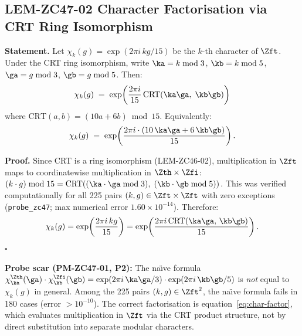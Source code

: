 \documentclass[12pt, a4paper]{article}
\begin{document}
\subsection{LEM-ZC47-02 \quad Character Factorisation via CRT
  Ring Isomorphism}
\label{sec:lem02}


\begin{formalbox}[title={LEM-ZC47-02: Character Factorisation
  (CRT Ring Isomorphism Form)}]
\textbf{Statement.}
Let $\chi_k(g) = \exp(2\pi i\, k g / 15)$ be the $k$-th
character of $\Zft$.
Under the CRT ring isomorphism, write
$\ka = k \bmod 3$, $\kb = k \bmod 5$,
$\ga = g \bmod 3$, $\gb = g \bmod 5$.
Then:
\begin{equation}
  \chi_k(g)
  \;=\;
  \exp\!\left(\frac{2\pi i}{15}\,
    \mathrm{CRT}(\ka\ga,\; \kb\gb)\right)
  \label{eq:char-factor}
\end{equation}
where $\mathrm{CRT}(a, b) = (10a + 6b) \bmod 15$.
Equivalently:
\begin{equation}
  \chi_k(g)
  \;=\;
  \exp\!\left(\frac{2\pi i \cdot (10\,\ka\ga + 6\,\kb\gb)}{15}\right).
  \label{eq:char-factor-expl}
\end{equation}

\textbf{Proof.}
Since CRT is a ring isomorphism
(LEM-ZC46-02), multiplication in $\Zft$ maps to coordinatewise
multiplication in $\Zth \times \Zfi$:
$(k \cdot g) \bmod 15 = \mathrm{CRT}((\ka\cdot\ga \bmod 3),\;
(\kb\cdot\gb \bmod 5))$.
This was verified computationally for all 225 pairs
$(k,g) \in \Zft \times \Zft$ with zero exceptions
(\texttt{probe\_zc47}; max numerical error $1.60 \times 10^{-14}$).
Therefore:
\[
  \chi_k(g)
  = \exp\!\left(\frac{2\pi i\, kg}{15}\right)
  = \exp\!\left(\frac{2\pi i\,\mathrm{CRT}(\ka\ga,\,\kb\gb)}{15}\right).
\]
\hfill$\square$

\textbf{Probe scar (PM-ZC47-01, P2):}
The na\"{\i}ve formula
$\chi_{\ka}^{\Zth}(\ga)\cdot\chi_{\kb}^{\Zfi}(\gb)
= \exp(2\pi i\,\ka\ga/3)\cdot\exp(2\pi i\,\kb\gb/5)$
is \emph{not} equal to $\chi_k(g)$ in general.
Among the 225 pairs $(k,g) \in \Zft^2$, the na\"{\i}ve formula
fails in 180 cases (error $> 10^{-10}$).
The correct factorisation is equation~\eqref{eq:char-factor},
which evaluates multiplication in $\Zft$ via the CRT product
structure, not by direct substitution into separate modular
characters.
\end{formalbox}
\end{document}
